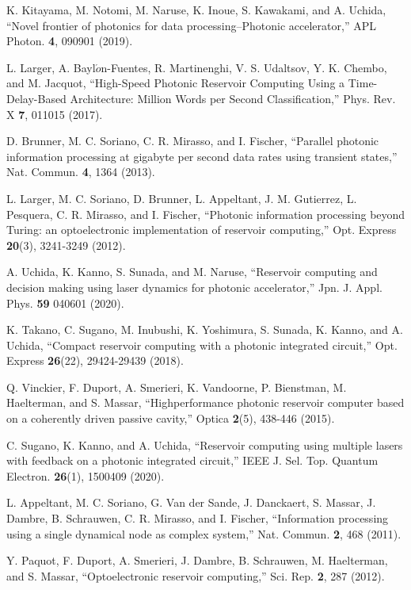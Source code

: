 \documentclass{article}
\begin{document}
\begin{thebibliography}{9}
K. Kitayama, M. Notomi, M. Naruse, K. Inoue, S. Kawakami, and A. Uchida,
``Novel frontier of photonics for data processing--Photonic
	accelerator,''
APL Photon. {\bf 4}, 090901 (2019). 

L. Larger, A. Bayl$\acute{o}$n-Fuentes, R. Martinenghi, V. S. Udaltsov,
	Y. K. Chembo, and M. Jacquot,
``High-Speed Photonic Reservoir Computing Using a Time-Delay-Based
	Architecture: Million Words per Second Classification,''
Phys. Rev. X {\bf 7}, 011015 (2017). 

D. Brunner, M. C. Soriano, C. R. Mirasso, and I. Fischer, 
``Parallel photonic information processing at gigabyte
per second data rates using transient states,'' 
Nat. Commun. {\bf 4}, 1364 (2013).

L. Larger, M. C. Soriano, D. Brunner, L. Appeltant, J. M. Gutierrez,
	L. Pesquera, 
C. R. Mirasso, and I. Fischer,
``Photonic information processing beyond Turing: an optoelectronic implementation of reservoir computing,''
Opt. Express {\bf 20}(3), 3241-3249 (2012).

A. Uchida, K. Kanno, S. Sunada, and M. Naruse,
``Reservoir computing and decision making using laser dynamics for photonic
accelerator,''
Jpn. J. Appl. Phys. {\bf 59} 040601 (2020).

K. Takano, C. Sugano, M. Inubushi, K. Yoshimura, S. Sunada, K. Kanno,
and A. Uchida,
``Compact reservoir computing with a photonic integrated circuit,''
Opt. Express {\bf 26}(22), 29424-29439 (2018). 

Q. Vinckier, F. Duport, A. Smerieri, K. Vandoorne, P. Bienstman,
	M. Haelterman, and S. Massar, 
``Highperformance photonic reservoir computer based on a coherently
	driven passive cavity,'' 
Optica {\bf 2}(5), 438-446 (2015). 

C. Sugano, K. Kanno, and A. Uchida, 
``Reservoir computing using multiple lasers with feedback on a photonic
	integrated circuit,'' 
IEEE J. Sel. Top. Quantum Electron. {\bf 26}(1), 1500409 (2020).

L. Appeltant, M. C. Soriano, G. Van der Sande, J. Danckaert, S. Massar, J. Dambre, B. Schrauwen, C. R. Mirasso, and I. Fischer, 
``Information processing using a single dynamical node as complex
	system,'' 
Nat. Commun. {\bf 2}, 468 (2011).

Y. Paquot, F. Duport, A. Smerieri, J. Dambre, B. Schrauwen,
	M. Haelterman, and S. Massar, 
``Optoelectronic reservoir computing,'' Sci. Rep. {\bf 2}, 287 (2012). 


\end{thebibliography}
\end{document}
